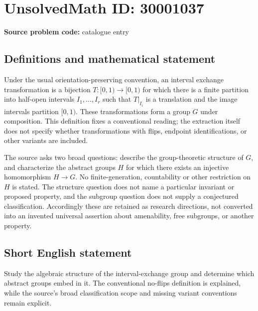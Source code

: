 \documentclass[11pt]{article}
\begin{document}
\section*{UnsolvedMath ID: 30001037}
\textbf{Source problem code:} catalogue entry
\subsection{Definitions and mathematical statement}
Under the usual orientation-preserving convention, an interval exchange transformation is a bijection \(T:[0,1)\to[0,1)\) for which there is a finite partition into half-open intervals \(I_1,\ldots,I_r\) such that \(T|_{I_i}\) is a translation and the image intervals partition \([0,1)\). These transformations form a group \(G\) under composition. This definition fixes a conventional reading; the extraction itself does not specify whether transformations with flips, endpoint identifications, or other variants are included.

The source asks two broad questions: describe the group-theoretic structure of \(G\), and characterize the abstract groups \(H\) for which there exists an injective homomorphism \(H\to G\). No finite-generation, countability or other restriction on \(H\) is stated. The structure question does not name a particular invariant or proposed property, and the subgroup question does not supply a conjectured classification. Accordingly these are retained as research directions, not converted into an invented universal assertion about amenability, free subgroups, or another property.
\subsection{Short English statement}
Study the algebraic structure of the interval-exchange group and determine which abstract groups embed in it. The conventional no-flips definition is explained, while the source's broad classification scope and missing variant conventions remain explicit.
\end{document}
